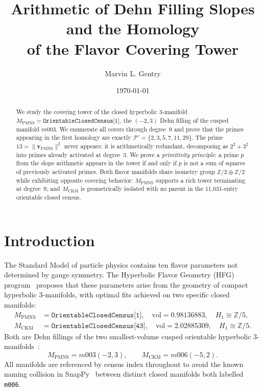 \documentclass[12pt]{article}
\title{Arithmetic of Dehn Filling Slopes and the Homology\\
of the Flavor Covering Tower}
\author{Marvin L. Gentry}
\affil{Independent Researcher, Seattle, WA\\
\texttt{drmlgentry@protonmail.com}\\
ORCID: 0009-0006-4550-2663}
\date{\today}
\theoremstyle{definition}
\begin{document}
\maketitle

\begin{abstract}
We study the covering tower of the closed hyperbolic 3-manifold
$M_{\mathrm{PMNS}} = \texttt{OrientableClosedCensus[1]}$, the
$(-2,3)$ Dehn filling of the cusped manifold $m003$.
We enumerate all covers through degree~9 and prove that the primes
appearing in the first homology are exactly
$\mathcal{P}' = \{2, 3, 5, 7, 11, 29\}$.
The prime $13 = \|\mathbf{v}_{\mathrm{PMNS}}\|^2$ never appears:
it is arithmetically redundant, decomposing as $2^2 + 3^2$ into
primes already activated at degree~3.
We prove a \emph{primitivity principle}: a prime $p$ from the
slope arithmetic appears in the tower if and only if $p$ is not
a sum of squares of previously activated primes.
Both flavor manifolds share isometry group
$\mathbb{Z}/2 \oplus \mathbb{Z}/2$ while exhibiting opposite
covering behavior: $M_{\mathrm{PMNS}}$ supports a rich tower
terminating at degree~9, and $M_{\mathrm{CKM}}$ is geometrically
isolated with no parent in the 11{,}031-entry orientable closed census.
\end{abstract}

\section{Introduction}

The Standard Model of particle physics contains ten flavor parameters
not determined by gauge symmetry. The Hyperbolic Flavor Geometry (HFG)
program~\cite{Gentry:CKM,Gentry:PMNS,Gentry:CP,Gentry:Twist} proposes
that these parameters arise from the geometry of compact hyperbolic
3-manifolds, with optimal fits achieved on two specific closed manifolds:
\begin{align*}
  M_{\mathrm{PMNS}} &= \texttt{OrientableClosedCensus[1]},\quad
    \mathrm{vol} = 0.98136883,\quad H_1 \cong \mathbb{Z}/5, \\
  M_{\mathrm{CKM}}  &= \texttt{OrientableClosedCensus[43]},\quad
    \mathrm{vol} = 2.02885309,\quad H_1 \cong \mathbb{Z}/5.
\end{align*}
Both are Dehn fillings of the two smallest-volume cusped orientable
hyperbolic 3-manifolds~\cite{Thurston}:
\[
  M_{\mathrm{PMNS}} = m003(-2,3), \qquad M_{\mathrm{CKM}} = m006(-5,2).
\]
All manifolds are referenced by census index throughout to avoid the
known naming collision in SnapPy~\cite{SnapPy} between distinct closed
manifolds both labelled \texttt{m006}.
\end{document}
